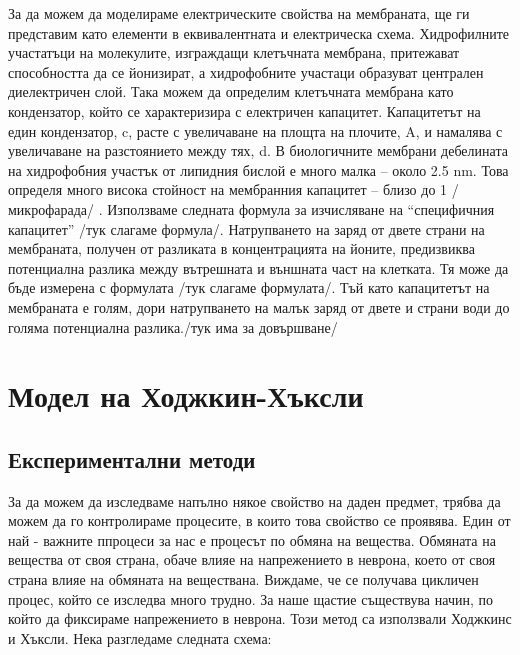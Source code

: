 \documentclass{article}
\begin{document}
За да можем да моделираме електрическите свойства на мембраната, ще ги представим като елементи в еквивалентната и електрическа схема. Хидрофилните участатъци на молекулите, изграждащи клетъчната мембрана, притежават способността да се йонизират, а хидрофобните участаци образуват централен диелектричен слой. Така можем да определим клетъчната мембрана като кондензатор, който се характеризира с електричен капацитет. Капацитетът на един кондензатор, c, расте с увеличаване на площта на плочите, A, и намалява с увеличаване на разстоянието между тях, d. В биологичните мембрани дебелината на хидрофобния участък от липидния бислой е много малка – около 2.5 nm. Това определя много висока стойност на мембранния капацитет – близо до 1 /микрофарада/ .  Използваме следната формула за изчисляване на “специфичния капацитет” /тук слагаме формула/. Натрупването на заряд от двете страни на мембраната, получен от разликата в концентрацията на йоните, предизвиква потенциална разлика между вътрешната и външната част на клетката. Тя може да бъде измерена с формулата /тук слагаме формулата/. Тъй като капацитетът на мембраната е голям, дори натрупването на малък заряд от двете и страни води до голяма потенциална разлика./тук има за довършване/  

\section{Модел на Ходжкин-Хъксли}
    \subsection[Експериментални методи]{Експериментални методи}
        За да можем да изследваме напълно някое свойство на даден предмет, трябва да можем да го контролираме процесите, в които това свойство
        се проявява.  Един от най - важните ппроцеси за нас е процесът по обмяна на вещества.  Обмяната на вещества от своя страна, обаче влияе
        на напрежението в неврона, което от своя страна влияе на обмяната на веществана. Виждаме, че се получава цикличен процес, който се
        изследва много трудно. За наше щастие съществува начин, по който да фиксираме напрежението в неврона. Този метод са използвали Ходжкинс
        и Хъксли. Нека разгледаме следната схема:
\end{document}
